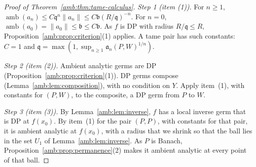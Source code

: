 \documentclass[11pt]{amsart}
\theoremstyle{definition}
\theoremstyle{remark}
\numberwithin{equation}{section}
\newcommand{\norm}[1]{\lVert #1\rVert}
\theoremstyle{plain}
\theoremstyle{definition}
\theoremstyle{plain}
\begin{document}
\begin{proof}[Proof of Theorem~\ref{amb:thm:tame-calculus}]
\emph{Step 1 (item (1)).} For $n\ge1$, $\operatorname{amb}(a_n)\le C\mathfrak q^n\norm{a_n}\le C\mathfrak b(R/\mathfrak q)^{-n}$. For $n=0$,
$\operatorname{amb}(a_0)=\norm{a_0}\le \mathfrak b\le C\mathfrak b$. As $f$ is DP with radius $R/\mathfrak q\le R$,
Proposition~\ref{amb:prop:criterion}(1) applies. A tame pair has such constants: $C=1$ and $\mathfrak q=\max(1,\sup_{n\ge1}\mathfrak a_n(P,W)^{1/n})$.

\emph{Step 2 (item (2)).} Ambient analytic germs are DP (Proposition~\ref{amb:prop:criterion}(1)). DP germs compose
(Lemma~\ref{amb:lem:composition}), with no condition on $Y$. Apply item~(1), with constants for $(P,W)$, to the composite, a DP germ from $P$ to $W$.

\emph{Step 3 (item (3)).} By Lemma~\ref{amb:lem:inverse}, $f$ has a local inverse germ that is DP at $f(x_0)$. By item~(1) for the
pair $(P,P)$, with constants for that pair, it is ambient analytic at $f(x_0)$, with a radius that we shrink so that the ball lies in the set $U_1$ of
Lemma~\ref{amb:lem:inverse}. As $P$ is Banach, Proposition~\ref{amb:prop:permanence}(2) makes it ambient analytic at every point of
that ball.
\end{proof}
\end{document}
